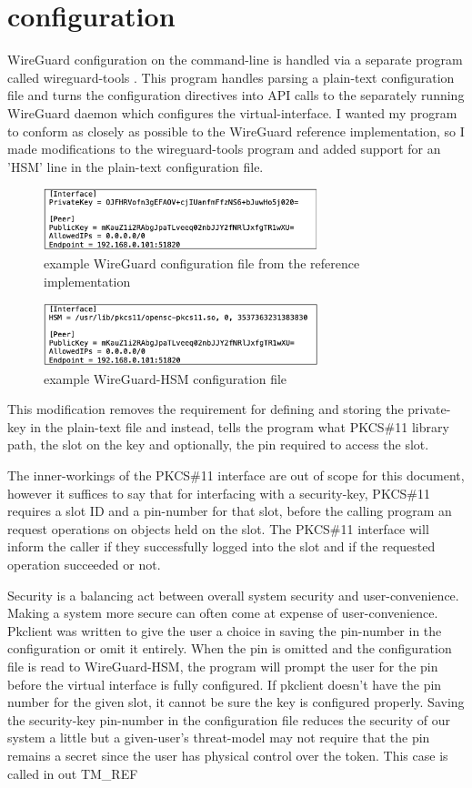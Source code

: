 \documentclass [11pt, proquest] {uwthesis}[2020/02/24]
\begin{document}
\section{configuration}
WireGuard configuration on the command-line is handled via a separate program called wireguard-tools \cite{noauthor_wireguard-tools_2022}. This program handles parsing a plain-text configuration file and turns the configuration directives into API calls to the separately running WireGuard daemon which configures the virtual-interface. I wanted my program to conform as closely as possible to the WireGuard reference implementation, so I made modifications to the wireguard-tools program and added support for an 'HSM' line in the plain-text configuration file. 
\begin{figure}[ht]
\includegraphics[width=8cm]{paper/images/wg_conf_std.png}
\caption{example WireGuard configuration file from the reference implementation}
\label{fig:wg_config}
\end{figure}

\begin{figure}[ht]
\includegraphics[width=8cm]{paper/images/wg_conf_hsm.png}
\caption{example WireGuard-HSM configuration file}
\label{fig:hsm_config}
\end{figure}
This modification removes the requirement for defining and storing the private-key in the plain-text file and instead, tells the program what PKCS\#11 library path, the slot on the key and optionally, the pin required to access the slot.

The inner-workings of the PKCS\#11 interface are out of scope for this document, however it suffices to say that for interfacing with a security-key, PKCS\#11 requires a slot ID and a pin-number for that slot, before the calling program an request operations on objects held on the slot. The PKCS\#11 interface will inform the caller if they successfully logged into the slot and if the requested operation succeeded or not.

Security is a balancing act between overall system security and user-convenience. Making a system more secure can often come at expense of user-convenience. Pkclient was written to give the user a choice in saving the pin-number in the configuration or omit it entirely. When the pin is omitted and the configuration file is read to WireGuard-HSM, the program will prompt the user for the pin before the virtual interface is fully configured. If pkclient doesn't have the pin number for the given slot, it cannot be sure the key is configured properly. Saving the security-key pin-number in the configuration file reduces the security of our system a little but a given-user's threat-model may not require that the pin remains a secret since the user has physical control over the token. This case is called in out TM\_REF
\end{document}
